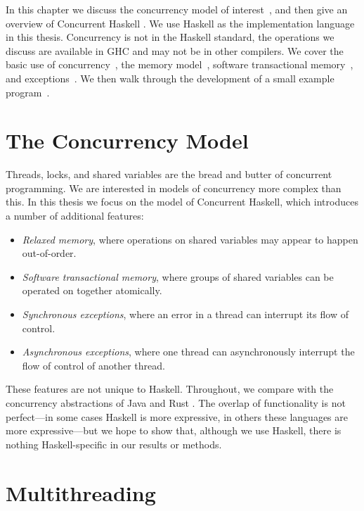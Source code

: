 In this chapter we discuss the concurrency model of
interest~, and then give an overview of
Concurrent Haskell \parencite{peytonjones2005,peytonjones1996}.  We
use Haskell as the implementation language in this thesis.
Concurrency is not in the Haskell standard, the operations we discuss
are available in GHC and may not be in other compilers.  We cover the
basic use of concurrency~, the memory
model~, software transactional
memory~, and
exceptions~.  We then walk through the
development of a small example
program~.

\section{The Concurrency Model}
\label{sec:concurrent_haskell-model}

Threads, locks, and shared variables are the bread and butter of
concurrent programming.  We are interested in models of concurrency
more complex than this.  In this thesis we focus on the model of
Concurrent Haskell, which introduces a number of additional features:

\begin{itemize}
\item \emph{Relaxed memory}, where operations on shared variables may
  appear to happen out-of-order.
\item \emph{Software transactional memory}, where groups of shared
  variables can be operated on together atomically.
\item \emph{Synchronous exceptions}, where an error in a thread can
  interrupt its flow of control.
\item \emph{Asynchronous exceptions}, where one thread can
  asynchronously interrupt the flow of control of another thread.
\end{itemize}

These features are not unique to Haskell.  Throughout, we compare with
the concurrency abstractions of Java \parencite{lea1996} and Rust
\parencite{rust2011}.  The overlap of functionality is not
perfect---in some cases Haskell is more expressive, in others these
languages are more expressive---but we hope to show that, although we
use Haskell, there is nothing Haskell-specific in our results or
methods.

\section{Multithreading}
\label{sec:concurrent_haskell-threads}

